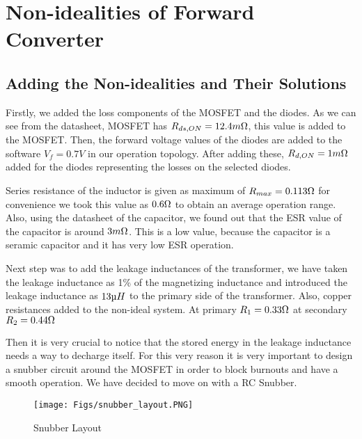 \section{Non-idealities of Forward Converter}

\subsection{Adding the Non-idealities and Their Solutions}

Firstly, we added the loss components of the MOSFET and the diodes. As we can see from the datasheet, MOSFET has $R_{ds,ON} = 12.4 m\ohm$, this value is added to the MOSFET. Then, the forward voltage values of the diodes are added to the software $V_f = 0.7V$ in our operation topology. After adding these, $R_{d,ON} = 1 m\ohm$ added for the diodes representing the losses on the selected diodes.

Series resistance of the inductor is given as maximum of $R_{max} = 0.113 \ohm$ for convenience we took this value as $0.6 \ohm$ to obtain an average operation range. Also, using the datasheet of the capacitor, we found out that the ESR value of the capacitor is around $3 m\ohm$. This is a low value, because the capacitor is a seramic capacitor and it has very low ESR operation.

Next step was to add the leakage inductances of the transformer, we have taken the leakage inductance as 1\% of the magnetizing inductance and introduced the leakage inductance as $13 \micro H$ to the primary side of the transformer. Also, copper resistances added to the non-ideal system. At primary $R_1 = 0.33 \ohm$ at secondary $R_2 = 0.44 \ohm$

Then it is very crucial to notice that the stored energy in the leakage inductance needs a way to decharge itself. For this very reason it is very important to design a snubber circuit around the MOSFET in order to block burnouts and have a smooth operation. We have decided to move on with a RC Snubber.

\begin{wrapfigure}{r}{0.5\textwidth}
  \vspace{-10pt}
  \begin{center}
    \texttt{[image: Figs/snubber\_layout.PNG]}
  \end{center}
  \vspace{-10pt}
  \caption{Snubber Layout}
  \label{Snubberlayout}
  \vspace{-10pt}
\end{wrapfigure}

